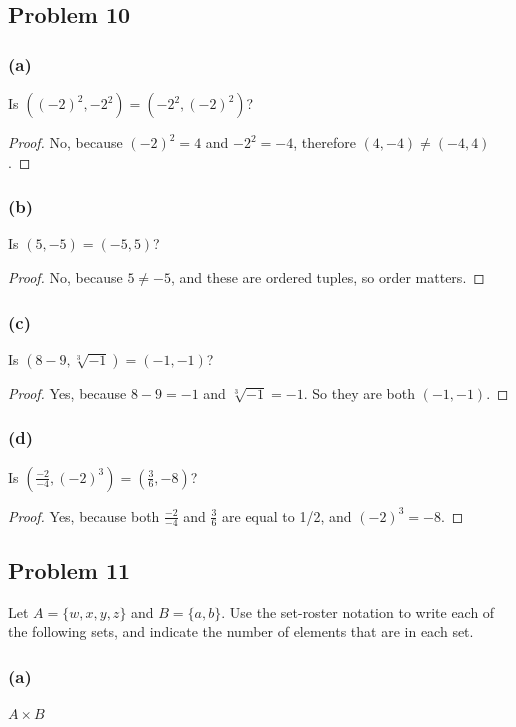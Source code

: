 \documentclass[14pt]{extarticle}
\begin{document}
\subsection{Problem 10}
\subsubsection{(a)}
Is $((-2)^2, -2^2) = (-2^2, (-2)^2)$?

\begin{proof}
    No, because $(-2)^2 = 4$ and $-2^2 = -4$, therefore $(4, -4) \neq (-4, 4)$.
\end{proof}

\subsubsection{(b)}
Is $(5, -5) = (-5, 5)$?

\begin{proof}
    No, because $5 \neq -5$, and these are ordered tuples, so order matters.
\end{proof}

\subsubsection{(c)}
Is $(8 - 9, \sqrt[3]{-1}) = (-1, -1)$?

\begin{proof}
    Yes, because $8 - 9 = -1$ and $\sqrt[3]{-1} = -1$. So they are both $(-1, -1)$.
\end{proof}

\subsubsection{(d)}
Is $(\frac{-2}{-4}, (-2)^3) = (\frac{3}{6}, -8)$?

\begin{proof}
    Yes, because both $\frac{-2}{-4}$ and $\frac{3}{6}$ are equal to 1/2, and
    $(-2)^3 = -8$.
\end{proof}

\subsection{Problem 11}
Let $A = \{w, x, y, z\}$ and $B = \{a, b\}$. Use the set-roster notation to
write each of the following sets, and indicate the number of elements that are
in each set.

\subsubsection{(a)}
$A \times B$
\end{document}
